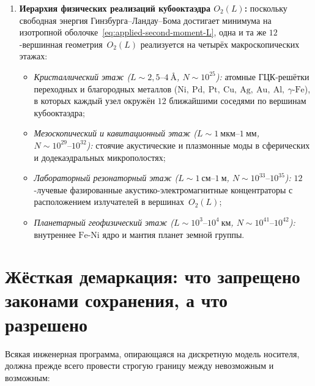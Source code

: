 \begin{theorem}
\begin{enumerate}[leftmargin=*]
\item \textbf{Иерархия физических реализаций кубооктаэдра $O_2(L)$:}
  поскольку свободная энергия Гинзбурга--Ландау--Бома достигает минимума на изотропной оболочке~\eqref{eq:applied-second-moment-L}, одна и та же $12$-вершинная геометрия~$O_2(L)$ реализуется на четырёх макроскопических этажах:
  \begin{itemize}[nosep,leftmargin=*]
  \item \emph{Кристаллический этаж ($L \sim 2{,}5\text{--}4\ \text{\AA}$, $N\sim 10^{25}$):} атомные ГЦК-решётки переходных и благородных металлов ($\mathrm{Ni},\ \mathrm{Pd},\ \mathrm{Pt},\ \mathrm{Cu},\ \mathrm{Ag},\ \mathrm{Au},\ \mathrm{Al},\ \gamma\text{-}\mathrm{Fe}$), в которых каждый узел окружён $12$ ближайшими соседями по вершинам кубооктаэдра;
  \item \emph{Мезоскопический и кавитационный этаж ($L \sim 1\ \text{мкм}\text{--}1\ \text{мм}$, $N\sim 10^{29}\text{--}10^{32}$):} стоячие акустические и плазмонные моды в сферических и додекаэдральных микрополостях;
  \item \emph{Лабораторный резонаторный этаж ($L \sim 1\ \text{см}\text{--}1\ \text{м}$, $N\sim 10^{33}\text{--}10^{35}$):} $12$-лучевые фазированные акустико-электромагнитные концентраторы с расположением излучателей в вершинах~$O_2(L)$;
  \item \emph{Планетарный геофизический этаж ($L \sim 10^3\text{--}10^4\ \text{км}$, $N\sim 10^{41}\text{--}10^{42}$):} внутреннее $\mathrm{Fe}\text{-}\mathrm{Ni}$ ядро и мантия планет земной группы.
  \end{itemize}
\end{enumerate}
\end{theorem}

\section{Жёсткая демаркация: что запрещено законами сохранения, а что разрешено}
\label{sec:applied-permitted-vs-forbidden}

Всякая инженерная программа, опирающаяся на дискретную модель носителя, должна прежде всего провести строгую границу между невозможным и возможным:

